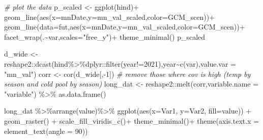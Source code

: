 \documentclass[
]{article}
\newenvironment{Shaded}{\begin{snugshade}}{\end{snugshade}}
\newcommand{\AttributeTok}[1]{\textcolor[rgb]{0.77,0.63,0.00}{#1}}
\newcommand{\CommentTok}[1]{\textcolor[rgb]{0.56,0.35,0.01}{\textit{#1}}}
\newcommand{\DecValTok}[1]{\textcolor[rgb]{0.00,0.00,0.81}{#1}}
\newcommand{\FunctionTok}[1]{\textcolor[rgb]{0.00,0.00,0.00}{#1}}
\newcommand{\NormalTok}[1]{#1}
\newcommand{\OtherTok}[1]{\textcolor[rgb]{0.56,0.35,0.01}{#1}}
\newcommand{\SpecialCharTok}[1]{\textcolor[rgb]{0.00,0.00,0.00}{#1}}
\newcommand{\StringTok}[1]{\textcolor[rgb]{0.31,0.60,0.02}{#1}}
\begin{document}
\begin{Shaded}
\begin{Highlighting}[]
      \CommentTok{\# plot the data}
\NormalTok{       p\_scaled }\OtherTok{\textless{}{-}} \FunctionTok{ggplot}\NormalTok{(hind)}\SpecialCharTok{+}
         \FunctionTok{geom\_line}\NormalTok{(}\FunctionTok{aes}\NormalTok{(}\AttributeTok{x=}\NormalTok{mnDate,}\AttributeTok{y=}\NormalTok{mn\_val\_scaled,}\AttributeTok{color=}\NormalTok{GCM\_scen))}\SpecialCharTok{+}
         \FunctionTok{geom\_line}\NormalTok{(}\AttributeTok{data=}\NormalTok{fut,}\FunctionTok{aes}\NormalTok{(}\AttributeTok{x=}\NormalTok{mnDate,}\AttributeTok{y=}\NormalTok{mn\_val\_scaled,}\AttributeTok{color=}\NormalTok{GCM\_scen))}\SpecialCharTok{+}
         \FunctionTok{facet\_wrap}\NormalTok{(.}\SpecialCharTok{\textasciitilde{}}\NormalTok{var,}\AttributeTok{scales=}\StringTok{"free\_y"}\NormalTok{)}\SpecialCharTok{+}
         \FunctionTok{theme\_minimal}\NormalTok{()}
\NormalTok{      p\_scaled}
      
\NormalTok{      d\_wide }\OtherTok{\textless{}{-}}\NormalTok{ reshape2}\SpecialCharTok{::}\FunctionTok{dcast}\NormalTok{(hind}\SpecialCharTok{\%\textgreater{}\%}\NormalTok{dplyr}\SpecialCharTok{::}\FunctionTok{filter}\NormalTok{(year}\SpecialCharTok{!=}\DecValTok{2021}\NormalTok{),year}\SpecialCharTok{\textasciitilde{}}\FunctionTok{c}\NormalTok{(var),}\AttributeTok{value.var =} \StringTok{"mn\_val"}\NormalTok{)}
\NormalTok{      corr   }\OtherTok{\textless{}{-}} \FunctionTok{cor}\NormalTok{(d\_wide[,}\SpecialCharTok{{-}}\DecValTok{1}\NormalTok{])}
      \CommentTok{\# remove those where cov is high (temp by season and cold pool by season)}
\NormalTok{      long\_dat }\OtherTok{\textless{}{-}}\NormalTok{ reshape2}\SpecialCharTok{::}\FunctionTok{melt}\NormalTok{(corr,}\AttributeTok{variable.name =} \StringTok{"variable"}\NormalTok{) }\SpecialCharTok{\%\textgreater{}\%} 
      \FunctionTok{as.data.frame}\NormalTok{() }
      
\NormalTok{      long\_dat }\SpecialCharTok{\%\textgreater{}\%}\FunctionTok{arrange}\NormalTok{(value)}\SpecialCharTok{\%\textgreater{}\%}
      \FunctionTok{ggplot}\NormalTok{(}\FunctionTok{aes}\NormalTok{(}\AttributeTok{x=}\NormalTok{Var1, }\AttributeTok{y=}\NormalTok{Var2, }\AttributeTok{fill=}\NormalTok{value)) }\SpecialCharTok{+} 
      \FunctionTok{geom\_raster}\NormalTok{() }\SpecialCharTok{+} 
      \FunctionTok{scale\_fill\_viridis\_c}\NormalTok{()}\SpecialCharTok{+}
      \FunctionTok{theme\_minimal}\NormalTok{()}\SpecialCharTok{+}
      \FunctionTok{theme}\NormalTok{(}\AttributeTok{axis.text.x =} \FunctionTok{element\_text}\NormalTok{(}\AttributeTok{angle =} \DecValTok{90}\NormalTok{))}


\end{Highlighting}
\end{Shaded}
\end{document}
